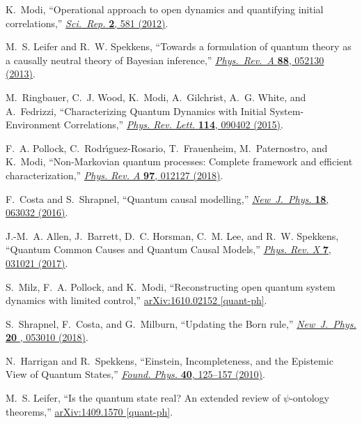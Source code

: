 \documentclass[a4paper,onecolumn,11pt,accepted=2018-05-04]{quantumarticle}
\begin{document}
\begin{thebibliography}{10}
K.~Modi, ``Operational approach to open dynamics and quantifying initial
  correlations,'' \href{http://dx.doi.org/10.1038/srep00581}{{\em Sci.\
  Rep.} {\bfseries 2}, 581 (2012)}.

M.~S. Leifer and R.~W. Spekkens, ``Towards a formulation of quantum theory as a
  causally neutral theory of Bayesian inference,''
  \href{http://dx.doi.org/10.1103/PhysRevA.88.052130}{{\em Phys.\ Rev.\ A}
  {\bfseries 88}, 052130 (2013)}.

M.~Ringbauer, C.~J. Wood, K.~Modi, A.~Gilchrist, A.~G. White, and A.~Fedrizzi,
  ``Characterizing Quantum Dynamics with Initial System-Environment
  Correlations,'' \href{http://dx.doi.org/10.1103/PhysRevLett.114.090402}{{\em
  Phys. Rev. Lett.} {\bfseries 114}, 090402 (2015)}.

F.~A. Pollock, C.~Rodr\'{\i}guez-Rosario, T.~Frauenheim, M.~Paternostro, and
  K.~Modi, ``Non-Markovian quantum processes: Complete framework and efficient
  characterization,'' \href{http://dx.doi.org/10.1103/PhysRevA.97.012127}{{\em
  Phys. Rev. A} {\bfseries 97}, 012127 (2018)}.

F.~Costa and S.~Shrapnel, ``Quantum causal modelling,''
  \href{https://doi.org/10.1088/1367-2630/18/6/063032}{{\em
  New\ J.\ Phys.} {\bfseries 18}, 063032 (2016)}.

J.-M.~A. Allen, J.~Barrett, D.~C. Horsman, C.~M. Lee, and R.~W. Spekkens,
  ``Quantum Common Causes and Quantum Causal Models,''
  \href{http://dx.doi.org/10.1103/PhysRevX.7.031021}{{\em Phys. Rev. X}
  {\bfseries 7}, 031021 (2017)}.

S.~Milz, F.~A. Pollock, and K.~Modi, ``Reconstructing open quantum system
  dynamics with limited control,''
  \href{http://arxiv.org/abs/1610.02152}{{\ttfamily arXiv:1610.02152
  [quant-ph]}}.

S.~Shrapnel, F.~Costa, and G.~Milburn, ``Updating the Born rule,''
\href{https://doi.org/10.1088/1367-2630/aabe12}{{\em
  New\ J.\ Phys.} {\bfseries 20 }, 053010 (2018)}.

N.~Harrigan and R.~Spekkens, ``Einstein, Incompleteness, and the Epistemic View
  of Quantum States,'' \href{http://dx.doi.org/10.1007/s10701-009-9347-0}{{\em
  Found. Phys.} {\bfseries 40}, 125--157 (2010)}.

M.~S. Leifer, ``Is the quantum state real? An extended review of
  $\psi$-ontology theorems,'' \href{http://arxiv.org/abs/1409.1570}{{\ttfamily
  arXiv:1409.1570 [quant-ph]}}.


\end{thebibliography}
\end{document}
